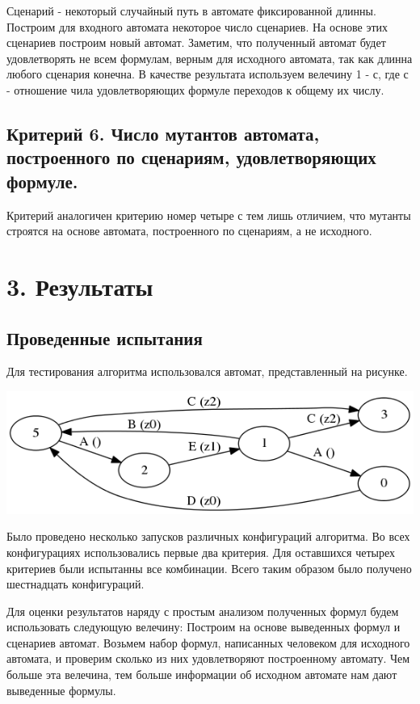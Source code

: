 \documentclass[12pt]{article}
\begin{document}
Сценарий - некоторый случайный путь в автомате фиксированной длинны. Построим для входного автомата некоторое
число сценариев. На основе этих сценариев построим новый автомат. Заметим, что полученный автомат будет удовлетворять
не всем формулам, верным для исходного автомата, так как длинна любого сценария конечна. В качестве результата используем
велечину 1 - с, где с - отношение чила удовлетворяющих формуле переходов к общему их числу.

\subsection*{Критерий 6. Число мутантов автомата, построенного по сценариям, удовлетворяющих формуле.}

Критерий аналогичен критерию номер четыре с тем лишь отличием, что мутанты строятся на основе автомата, построенного по
сценариям, а не исходного.

\section*{3. Результаты}

\subsection*{Проведенные испытания}

Для тестирования алгоритма использовался автомат, представленный на рисунке.

\includegraphics[scale=0.5]{lift.png}

Было проведено несколько запусков различных конфигураций алгоритма. Во всех конфигурациях использовались первые два критерия.
Для оставшихся четырех критериев были испытанны все комбинации. Всего таким образом было получено шестнадцать конфигураций.

Для оценки результатов наряду с простым анализом полученных формул будем использовать следующую велечину:
Построим на основе выведенных формул и сценариев автомат. Возьмем набор формул, написанных человеком для исходного автомата, и
проверим сколько из них удовлетворяют построенному автомату. Чем больше эта велечина, тем больше информации об исходном
автомате нам дают выведенные формулы.
\end{document}
